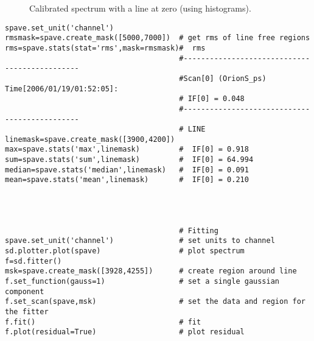 \begin{figure}[h!]
\caption{\label{fig:spave} Calibrated spectrum with a line at zero (using histograms).}
\hrulefill
\end{figure}
 
\small
\begin{verbatim}
spave.set_unit('channel')                                                               
rmsmask=spave.create_mask([5000,7000])  # get rms of line free regions                  
rms=spave.stats(stat='rms',mask=rmsmask)#  rms
                                        #---------------------------------------------- 
                                        #Scan[0] (OrionS_ps) Time[2006/01/19/01:52:05]: 
                                        # IF[0] = 0.048
                                        #----------------------------------------------
                                        # LINE
linemask=spave.create_mask([3900,4200])
max=spave.stats('max',linemask)         #  IF[0] = 0.918
sum=spave.stats('sum',linemask)         #  IF[0] = 64.994
median=spave.stats('median',linemask)   #  IF[0] = 0.091
mean=spave.stats('mean',linemask)       #  IF[0] = 0.210
                                                                                        
                                                                                        
                                                                                        
                                                                                        
                                        # Fitting
spave.set_unit('channel')               # set units to channel                          
sd.plotter.plot(spave)                  # plot spectrum
f=sd.fitter()
msk=spave.create_mask([3928,4255])      # create region around line                     
f.set_function(gauss=1)                 # set a single gaussian component               
f.set_scan(spave,msk)                   # set the data and region for the fitter        
f.fit()                                 # fit                                           
f.plot(residual=True)                   # plot residual
\end{verbatim}
\normalsize


